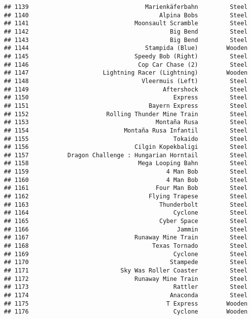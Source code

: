 \documentclass[
]{article}
\begin{document}
\begin{verbatim}
## 1139                                 Marienkäferbahn         Steel
## 1140                                     Alpina Bobs         Steel
## 1141                              Moonsault Scramble         Steel
## 1142                                        Big Bend         Steel
## 1143                                        Big Bend         Steel
## 1144                                 Stampida (Blue)        Wooden
## 1145                              Speedy Bob (Right)         Steel
## 1146                               Cop Car Chase (2)         Steel
## 1147                     Lightning Racer (Lightning)        Wooden
## 1148                                Vleermuis (Left)         Steel
## 1149                                      Aftershock         Steel
## 1150                                         Express         Steel
## 1151                                  Bayern Express         Steel
## 1152                      Rolling Thunder Mine Train         Steel
## 1153                                    Montaña Rusa         Steel
## 1154                           Montaña Rusa Infantil         Steel
## 1155                                         Tokaido         Steel
## 1156                              Cilgin Kopekbaligi         Steel
## 1157           Dragon Challenge : Hungarian Horntail         Steel
## 1158                               Mega Looping Bahn         Steel
## 1159                                       4 Man Bob         Steel
## 1160                                       4 Man Bob         Steel
## 1161                                    Four Man Bob         Steel
## 1162                                  Flying Trapese         Steel
## 1163                                     Thunderbolt         Steel
## 1164                                         Cyclone         Steel
## 1165                                     Cyber Space         Steel
## 1166                                          Jammin         Steel
## 1167                              Runaway Mine Train         Steel
## 1168                                   Texas Tornado         Steel
## 1169                                         Cyclone         Steel
## 1170                                        Stampede         Steel
## 1171                          Sky Was Roller Coaster         Steel
## 1172                              Runaway Mine Train         Steel
## 1173                                         Rattler         Steel
## 1174                                        Anaconda         Steel
## 1175                                       T Express        Wooden
## 1176                                         Cyclone        Wooden

\end{verbatim}
\end{document}
